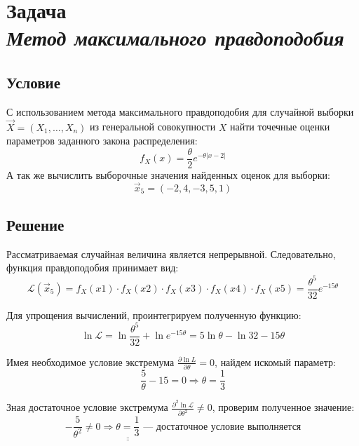 \section*{Задача \\\textit{Метод максимального правдоподобия}}

\subsection*{Условие}
\sloppy С использованием метода максимального правдоподобия для случайной выборки $\vec{X} = (X_1,\dots,X_n)$ из генеральной совокупности $X$ найти точечные оценки параметров заданного закона распределения:
\begin{equation*}
    f_X(x) = \frac{\theta}{2} e^{-\theta |x - 2|}
\end{equation*}
А так же вычислить выборочные значения найденных оценок для выборки:
\begin{equation*}
    \vec{x}_5 = (-2, 4, -3, 5, 1)
\end{equation*}

\subsection*{Решение}
Рассматриваемая случайная величина является непрерывной. Следовательно, функция правдоподобия принимает вид:
\begin{equation*}
    \mathcal{L}(\vec{x}_5) = f_X(x1) \cdot f_X(x2) \cdot f_X(x3) \cdot f_X(x4) \cdot f_X(x5) = \frac{\theta^5}{32}e^{-15 \theta}
\end{equation*}

Для упрощения вычислений, проинтегрируем полученную функцию:
\begin{equation*}
    \ln \mathcal{L} = \ln\frac{\theta^5}{32} + \ln e^{-15 \theta} = 5 \ln \theta - \ln 32 - 15 \theta
\end{equation*}

Имея необходимое условие экстремума $\frac{\partial \ln L}{\partial \theta} = 0$, найдем искомый параметр:
\begin{equation*}
    \frac{5}{\theta} - 15 = 0 \Rightarrow \theta = \frac{1}{3}
\end{equation*}

Зная достаточное условие экстремума $\frac{\partial^2 \ln \mathcal{L}}{\partial \theta^2} \neq 0$, проверим полученное значение:
\begin{equation*}
    -\frac{5}{\theta^2} \neq 0 \Rightarrow \underline{\underline{\theta = \frac{1}{3}}} \text{~--- достаточное условие выполняется}
\end{equation*}

